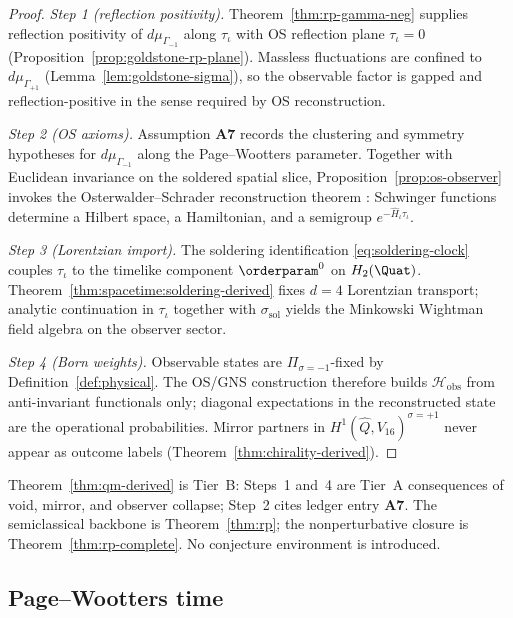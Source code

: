\begin{proof}
\emph{Step 1 (reflection positivity).}
Theorem~\ref{thm:rp-gamma-neg} supplies reflection positivity of
$d\mu_{\Gamma_{-1}}$ along $\tau_\iota$ with OS reflection plane
$\tau_\iota=0$ (Proposition~\ref{prop:goldstone-rp-plane}). Massless
fluctuations are confined to $d\mu_{\Gamma_{+1}}$
(Lemma~\ref{lem:goldstone-sigma}), so the observable factor is gapped and
reflection-positive in the sense required by OS reconstruction.

\emph{Step 2 (OS axioms).}
Assumption \textbf{A7} records the clustering and symmetry hypotheses for
$d\mu_{\Gamma_{-1}}$ along the Page--Wootters parameter. Together with
Euclidean invariance on the soldered spatial slice, Proposition~\ref{prop:os-observer}
invokes the Osterwalder--Schrader reconstruction theorem
\cite{OsterwalderSchrader1973}: Schwinger functions determine a Hilbert space,
a Hamiltonian, and a semigroup $e^{-\hat H_\iota\tau_\iota}$.

\emph{Step 3 (Lorentzian import).}
The soldering identification \eqref{eq:soldering-clock} couples
$\tau_\iota$ to the timelike component $\orderparam^0$ on $H_2(\Quat)$.
Theorem~\ref{thm:spacetime:soldering-derived} fixes $d=4$ Lorentzian transport;
analytic continuation in $\tau_\iota$ together with $\sigma_{\mathrm{sol}}$
yields the Minkowski Wightman field algebra on the observer sector.

\emph{Step 4 (Born weights).}
Observable states are $\Pi_{\sigma=-1}$-fixed by Definition~\ref{def:physical}.
The OS/GNS construction therefore builds $\mathcal{H}_{\mathrm{obs}}$ from
anti-invariant functionals only; diagonal expectations in the reconstructed
state are the operational probabilities. Mirror partners in
$H^1(\hat Q,V_{16})^{\sigma=+1}$ never appear as outcome labels
(Theorem~\ref{thm:chirality-derived}).
\end{proof}

\begin{remark}
Theorem~\ref{thm:qm-derived} is Tier~B: Steps~1 and~4 are Tier~A consequences
of void, mirror, and observer collapse; Step~2 cites ledger entry \textbf{A7}.
The semiclassical backbone is Theorem~\ref{thm:rp}; the nonperturbative closure
is Theorem~\ref{thm:rp-complete}. No conjecture environment is introduced.
\end{remark}

\subsection{Page--Wootters time}

